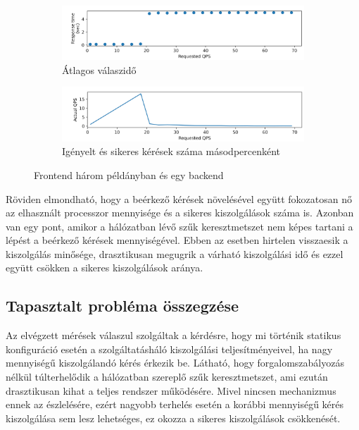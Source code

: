 \begin{figure}
\hfill
\begin{subfigure}{\textwidth}
    \includegraphics[width=\textwidth]{figures/3FE-1BE-stack/resp-time.png}
    \caption{Átlagos válaszidő}
    \label{subfig:stack-resp-time}
\end{subfigure}

\hfill
\begin{subfigure}{\textwidth}
    \includegraphics[width=\textwidth]{figures/3FE-1BE-stack/actual-qps.png}
    \caption{Igényelt és sikeres kérések száma másodpercenként}
    \label{subfig:stack-actual-qps}
\end{subfigure}
        
\caption{Frontend három példányban és egy backend}
\label{fig:3FE_stack_1BE}
\end{figure}

Röviden elmondható, hogy a beérkező kérések növelésével együtt fokozatosan nő az elhasznált processzor mennyisége és a sikeres kiszolgálások száma is.
Azonban van egy pont, amikor a hálózatban lévő szűk keresztmetszet nem képes tartani a lépést a beérkező kérések mennyiségével. 
Ebben az esetben hirtelen visszaesik a kiszolgálás minősége, drasztikusan megugrik a várható kiszolgálási idő és ezzel együtt csökken a sikeres kiszolgálások aránya.


\subsection{Tapasztalt probléma összegzése}
Az elvégzett mérések válaszul szolgáltak a kérdésre, hogy mi történik statikus konfiguráció esetén a szolgáltatásháló kiszolgálási teljesítményeivel, ha nagy mennyiségű kiszolgálandó kérés érkezik be.
Látható, hogy forgalomszabályozás nélkül túlterhelődik a hálózatban szereplő szűk keresztmetszet, ami ezután drasztikusan kihat a teljes rendszer működésére.
Mivel nincsen mechanizmus ennek az észlelésére, ezért nagyobb terhelés esetén a korábbi mennyiségű kérés kiszolgálása sem lesz lehetséges, ez okozza a sikeres kiszolgálások csökkenését.

